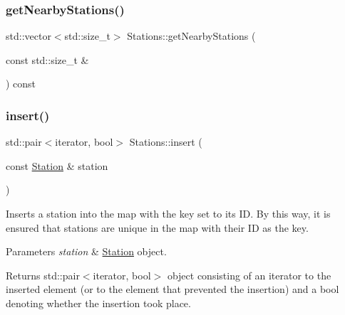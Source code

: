\mbox{\label{class_stations_afebcca23df46c02b2d4dfe53da2f03d1}} 
\subsubsection{\texorpdfstring{get\+Nearby\+Stations()}{getNearbyStations()}\hspace{0.1cm}{\footnotesize\ttfamily [2/2]}}
{\footnotesize\ttfamily std\+::vector$<$std\+::size\+\_\+t$>$ Stations\+::get\+Nearby\+Stations (\begin{DoxyParamCaption}\item[{const std\+::size\+\_\+t \&}]{ }\end{DoxyParamCaption}) const}

\mbox{\label{class_stations_abe1318af7b69c4eb586b099af6a1f6b8}} 
\subsubsection{\texorpdfstring{insert()}{insert()}}
{\footnotesize\ttfamily std\+::pair$<$iterator, bool$>$ Stations\+::insert (\begin{DoxyParamCaption}\item[{const \mbox{\hyperlink{class_station}{Station}} \&}]{station }\end{DoxyParamCaption})\hspace{0.3cm}{\ttfamily [inline]}}

Inserts a station into the map with the key set to its ID. By this way, it is ensured that stations are unique in the map with their ID as the key.


\begin{DoxyParams}{Parameters}
{\em station} & \mbox{\hyperlink{class_station}{Station}} object. \\
\hline
\end{DoxyParams}
\begin{DoxyReturn}{Returns}
std\+::pair$<$iterator, bool$>$ object consisting of an iterator to the inserted element (or to the element that prevented the insertion) and a bool denoting whether the insertion took place. 
\end{DoxyReturn}
\mbox{\label{class_stations_ae62b158dedf5f15c385671d15b950dc5}} 
